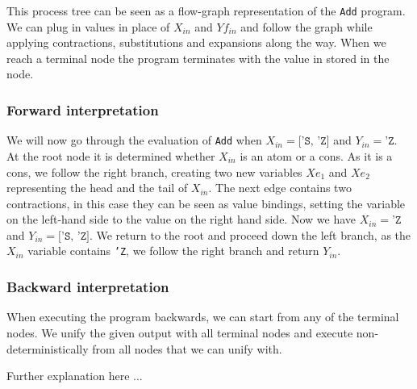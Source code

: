 \documentclass[10pt]{../sigplanconf}
\begin{document}
This process tree can be seen as a flow-graph representation of the
\texttt{Add} program. We can plug in values in place of $X_{in}$ and
$Yf_{in}$ and follow the graph while applying contractions,
substitutions and expansions along the way. When we reach a terminal
node the program terminates with the value in stored in the node.

\subsubsection{Forward interpretation}
We will now go through the evaluation of \texttt{Add} when $X_{in} =
\texttt{['S, 'Z]}$ and $Y_{in} = \texttt{'Z}$. At the root node it is
determined whether $X_{in}$ is an atom or a cons. As it is a cons, we
follow the right branch, creating two new variables $Xe_1$ and $Xe_2$
representing the head and the tail of $X_{in}$. The next edge contains
two contractions, in this case they can be seen as value bindings,
setting the variable on the left-hand side to the value on the right
hand side. Now we have $X_{in} = \texttt{'Z}$ and $Y_{in} =
\texttt{['S, 'Z]}$. We return to the root and proceed down the left
branch, as the $X_{in}$ variable contains \texttt{'Z}, we follow the
right branch and return $Y_{in}$.

\subsubsection{Backward interpretation}
When executing the program backwards, we can start from any of the
terminal nodes. We unify the given output with all terminal nodes and
execute non-deterministically from all nodes that we can unify with.

Further explanation here ...
\end{document}
